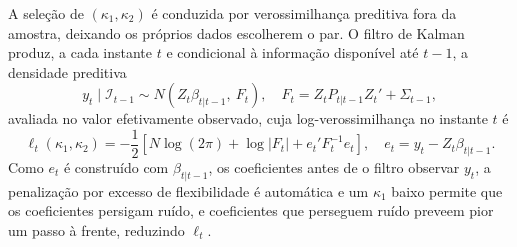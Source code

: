 \documentclass[12pt, a4paper, oneside, english, brazil]{abntex2}
\begin{document}
A seleção de $(\kappa_1, \kappa_2)$ é conduzida por
verossimilhança preditiva fora da amostra, deixando os próprios dados
escolherem o par. O filtro de Kalman produz, a cada instante $t$ e
condicional à informação disponível até $t-1$, a densidade preditiva
\begin{equation}
    y_t \mid \mathcal{I}_{t-1} \sim N\!\left(Z_t \beta_{t|t-1},\ F_t\right),
    \quad F_t = Z_t P_{t|t-1} Z_t' + \Sigma_{t-1},
    \label{eq:preditiva}
\end{equation}
avaliada no valor efetivamente observado, cuja log-verossimilhança no
instante $t$ é
\begin{equation}
    \ell_t(\kappa_1, \kappa_2) = -\frac{1}{2}
    \left[N \log(2\pi) + \log|F_t| + e_t' F_t^{-1} e_t\right],
    \quad e_t = y_t - Z_t \beta_{t|t-1}.
    \label{eq:loglik}
\end{equation}
Como $e_t$ é construído com $\beta_{t|t-1}$, os coeficientes antes de o
filtro observar $y_t$, a penalização por excesso de flexibilidade é
automática e um $\kappa_1$ baixo permite que os coeficientes persigam ruído,
e coeficientes que perseguem ruído preveem pior um passo à frente,
reduzindo $\ell_t$.
\end{document}
